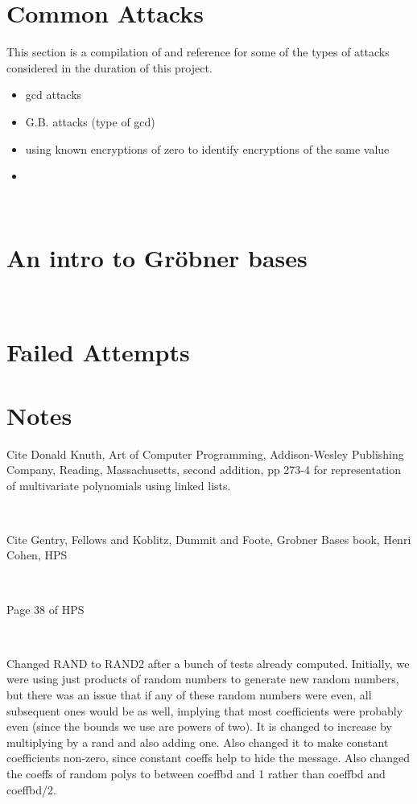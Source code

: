 \documentclass[11pt]{report}
\begin{document}
\section{Common Attacks}

This section is a compilation of and reference for some of the types of attacks considered in the duration of this project.

\begin{itemize}
\item gcd attacks
\item G.B. attacks (type of gcd)
\item using known encryptions of zero to identify encryptions of the same value
\item
\end{itemize}

\

\section{An intro to Gr\"obner bases}

\

\section{Failed Attempts}

\section{Notes}
Cite Donald Knuth, Art of Computer Programming, Addison-Wesley Publishing Company, Reading, Massachusetts, second addition, pp 273-4 for representation of multivariate polynomials using linked lists.

\

Cite Gentry, Fellows and Koblitz, Dummit and Foote, Grobner Bases book, Henri Cohen, HPS

\

Page 38 of HPS

\

Changed RAND to RAND2 after a bunch of tests already computed. Initially, we were using just products of random numbers to generate new random numbers, but there was an issue that if any of these random numbers were even, all subsequent ones would be as well, implying that most coefficients were probably even (since the bounds we use are powers of two). It is changed to increase by multiplying by a rand and also adding one. Also changed it to make constant coefficients non-zero, since constant coeffs help to hide the message. Also changed the coeffs of random polys to between coeffbd and 1 rather than coeffbd and coeffbd/2.
\end{document}

